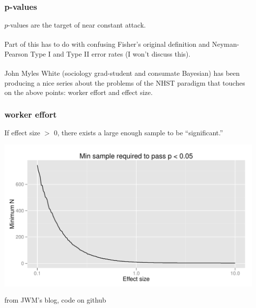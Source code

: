 \documentclass{beamer}\usepackage{graphicx, color}
\makeatletter
\def\maxwidth{ %
  \ifdim\Gin@nat@width>\linewidth
    \linewidth
  \else
    \Gin@nat@width
  \fi
}
\newenvironment{knitrout}{}{} %
\makeatother
\begin{document}
\begin{frame}
\frametitle{p-values}
\(p\)-values are the target of near constant attack.
\\~\\
Part of this has to do with confusing Fisher's original definition and Neyman-Pearson Type I and Type II error rates (I won't discuss this).
\\~\\
John Myles White (sociology grad-student and consumate Bayesian) has been producing a nice series about the problems of the NHST paradigm that touches on the above points: worker effort and effect size.
\end{frame}


\begin{frame}
\frametitle{worker effort}
If effect size \(>\) 0, there exists a large enough sample to be ``significant.''

\begin{knitrout}
\color{fgcolor}\includegraphics[width=\maxwidth]{figure/jwm-revpower} 
\end{knitrout}


\footnotesize{from JWM's blog, code on github}
\end{frame}
\end{document}
